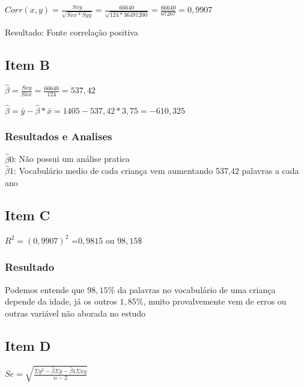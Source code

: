 \documentclass{article}
\begin{document}
            \begin{flushleft}
                $Corr(x,y) = \frac{Sxy}{\sqrt{Sxx * Syy}} = \frac{66640}{\sqrt{124 * 36491200}} = \frac{66640}{67267} = 0,9907 $

            \end{flushleft}
            
            Resultado: Fonte correlação positiva
    \subsection{Item B}
    
            \begin{flushleft}

                $\hat{\beta} = \frac{Sxy}{Sxx} = \frac{66640}{124} = 537,42$

                $\hat{\beta} = \bar{y} - \hat{\beta} * \bar{x} = 1405 -537,42 * 3,75 = -610,325$
            \end{flushleft}
            
            \subsubsection{Resultados e Analises}

            $\hat{\beta}0 $: Não possui um análise pratica \\    
            $\hat{\beta}1 $: Vocabulário medio de cada criança vem aumentando 537,42 palavras a cada ano

    \subsection{Item C}
            
            \begin{flushleft}
                $R^2 = (0,9907)^2$ =$0,9815$ ou $98,15\$$
            \end{flushleft}

        \subsubsection{Resultado}
        Podemos entende que $98,15\% $ da palavras no vocabulário de uma criança depende da idade, 
        já os outros $1,85\%$, muito provalvemente vem de erros ou outras variável não aborada no estudo
    
    \subsection{Item D}
    \begin{flushleft}
        $Se = \sqrt{ \frac{\Sigma y^2 - \hat{\beta } \Sigma y - \hat{\beta}1 \Sigma xy }{n-2}}$
    \end{flushleft}   
\end{document}
